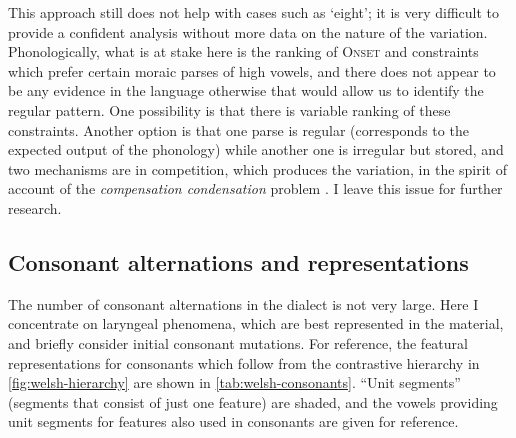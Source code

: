 This approach still does not help with cases such as \alternation{[ˈuiθ]}{[ˈwiːθ]} `eight'; it is very difficult to provide a confident analysis without more data on the nature of the variation. Phonologically, what is at stake here is the ranking of \textsc{Onset} and constraints which prefer certain moraic parses of high vowels, and there does not appear to be any evidence in the language otherwise that would allow us to identify the regular pattern. One possibility is that there is variable ranking of these constraints. Another option is that one parse is regular (\ie corresponds to the expected output of the phonology) while another one is irregular but stored, and two mechanisms are in competition, which produces the variation, in the spirit of  account of the \emph{compensation \vs condensation} problem \citep[\cf also][]{botero-mcmahon,collie07:_englis_strat_optim_theor}. I leave this issue for further research.

\subsection{Consonant alternations and representations}
\label{sec:cons-altern-repr}

The number of consonant alternations in the dialect is not very large. Here I concentrate on laryngeal phenomena, which are best represented in the material, and briefly consider initial consonant mutations. For reference, the featural representations for consonants which follow from the contrastive hierarchy in \cref{fig:welsh-hierarchy} are shown in \cref{tab:welsh-consonants}. \enquote{Unit segments} (\ie segments that consist of just one feature) are shaded, and the vowels providing unit segments for features also used in consonants are given for reference.

